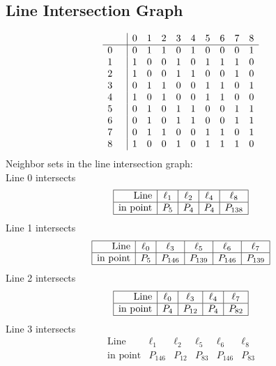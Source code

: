 \documentclass{article}
\begin{document}
{\subsection*{Line Intersection Graph}
{\arraycolsep=1pt
$$
\begin{array}{rr|*{9}r}
 &  & 0 & 1 & 2 & 3 & 4 & 5 & 6 & 7 & 8\\
\hline
0 &  & 0 & 1 & 1 & 0 & 1 & 0 & 0 & 0 & 1\\
1 &  & 1 & 0 & 0 & 1 & 0 & 1 & 1 & 1 & 0\\
2 &  & 1 & 0 & 0 & 1 & 1 & 0 & 0 & 1 & 0\\
3 &  & 0 & 1 & 1 & 0 & 0 & 1 & 1 & 0 & 1\\
4 &  & 1 & 0 & 1 & 0 & 0 & 1 & 1 & 0 & 0\\
5 &  & 0 & 1 & 0 & 1 & 1 & 0 & 0 & 1 & 1\\
6 &  & 0 & 1 & 0 & 1 & 1 & 0 & 0 & 1 & 1\\
7 &  & 0 & 1 & 1 & 0 & 0 & 1 & 1 & 0 & 1\\
8 &  & 1 & 0 & 0 & 1 & 0 & 1 & 1 & 1 & 0\\
\end{array}
$$
}%
Neighbor sets in the line intersection graph:\\
Line 0 intersects 
$$
\begin{array}{|r*{4}{|c}|}
\hline
\mbox{Line}  & \ell_{1} & \ell_{2} & \ell_{4} & \ell_{8}\\
\hline
\mbox{in point}  & P_{5} & P_{4} & P_{4} & P_{138}\\
\hline
\end{array}
$$
Line 1 intersects 
$$
\begin{array}{|r*{5}{|c}|}
\hline
\mbox{Line}  & \ell_{0} & \ell_{3} & \ell_{5} & \ell_{6} & \ell_{7}\\
\hline
\mbox{in point}  & P_{5} & P_{146} & P_{139} & P_{146} & P_{139}\\
\hline
\end{array}
$$
Line 2 intersects 
$$
\begin{array}{|r*{4}{|c}|}
\hline
\mbox{Line}  & \ell_{0} & \ell_{3} & \ell_{4} & \ell_{7}\\
\hline
\mbox{in point}  & P_{4} & P_{12} & P_{4} & P_{82}\\
\hline
\end{array}
$$
Line 3 intersects 
$$
\begin{array}{|r*{5}{|c}|}
\hline
\mbox{Line}  & \ell_{1} & \ell_{2} & \ell_{5} & \ell_{6} & \ell_{8}\\
\hline
\mbox{in point}  & P_{146} & P_{12} & P_{83} & P_{146} & P_{83}\\

\end{array}$$}
\end{document}

